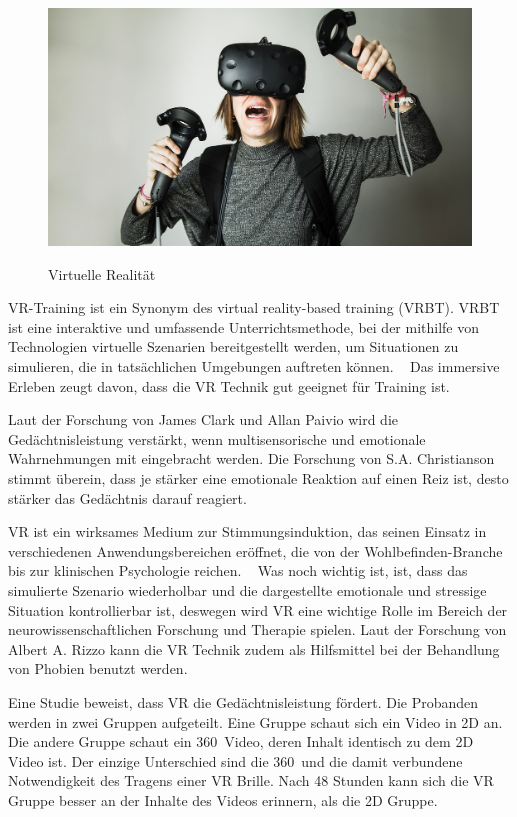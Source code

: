 \begin{figure}[ht]
\vspace*{1em}
\centering
\caption{Virtuelle Realität}
\includegraphics[width=\textwidth]{images/vrhtcvive.jpg}
\label{fig:vrhtcvive} 
\end{figure}

VR-Training ist ein Synonym des virtual reality-based training (VRBT). \glqq VRBT ist eine interaktive und umfassende Unterrichtsmethode, bei der mithilfe von Technologien virtuelle Szenarien bereitgestellt werden, um Situationen zu simulieren, die in tatsächlichen Umgebungen auftreten können. \grqq\ \citep{14} 
Das immersive Erleben zeugt davon, dass die VR Technik gut geeignet für Training ist.

Laut der Forschung von James Clark und Allan Paivio \citep{10} wird die Gedächtnisleistung verstärkt, wenn multisensorische und emotionale Wahrnehmungen mit eingebracht werden. Die Forschung von S.A. Christianson \citep{11} stimmt überein, dass je stärker eine emotionale Reaktion auf einen Reiz ist, desto stärker das Gedächtnis darauf reagiert. 

\glqq VR ist ein wirksames Medium zur Stimmungsinduktion, das seinen Einsatz in verschiedenen Anwendungsbereichen eröffnet, die von der Wohlbefinden-Branche bis zur klinischen Psychologie reichen. \grqq\ \citep{29} Was noch wichtig ist, ist, dass das simulierte Szenario wiederholbar und die dargestellte emotionale und stressige Situation kontrollierbar ist, deswegen wird VR eine wichtige Rolle im Bereich der neurowissenschaftlichen Forschung und Therapie spielen. \citep{13} Laut der Forschung von Albert A. Rizzo kann die VR Technik zudem als Hilfsmittel bei der Behandlung von Phobien benutzt werden. \citep{12}

Eine Studie \citep{30} beweist, dass VR die Gedächtnisleistung fördert. Die Probanden werden in zwei Gruppen aufgeteilt. Eine Gruppe schaut sich ein Video in 2D an. Die andere Gruppe schaut ein 360\degree\ Video, deren Inhalt identisch zu dem 2D Video ist. Der einzige Unterschied sind die 360\degree\ und die damit verbundene Notwendigkeit des Tragens einer VR Brille. Nach 48 Stunden kann sich die VR Gruppe besser an der Inhalte des Videos erinnern, als die 2D Gruppe.

